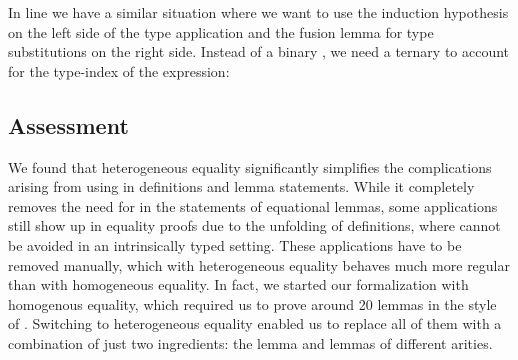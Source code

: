 \documentclass[acmsmall,anonymous,review,screen]{acmart}
\begin{document}
In line  we have a similar situation where we want to use the
induction hypothesis on the left side of the type application and the
fusion lemma for type substitutions on the right side.  Instead of a
binary {}, we need a ternary {} to account
for the type-index of the expression:
\SubstExamplesFusionESubESubHetProofC

\subsection{Assessment}
\label{sec:assessment}
We found that heterogeneous equality significantly simplifies the complications arising from
using {\Asubst} in definitions and lemma statements. While it completely removes the need for
{\Asubst} in the statements of equational lemmas, some {\Asubst}
applications still show up in equality proofs due to the unfolding of definitions, where {\Asubst}
cannot be avoided in an intrinsically typed setting.
These {\Asubst} applications have to be removed manually, which with heterogeneous
equality behaves much more regular than with homogeneous equality. In
fact, we started our formalization with homogenous equality,
which required us to prove around 20 lemmas in the style of
. Switching to heterogeneous equality enabled us to
replace all of them with a combination of just two ingredients: the {}
lemma and {} lemmas of different arities.










\end{document}
